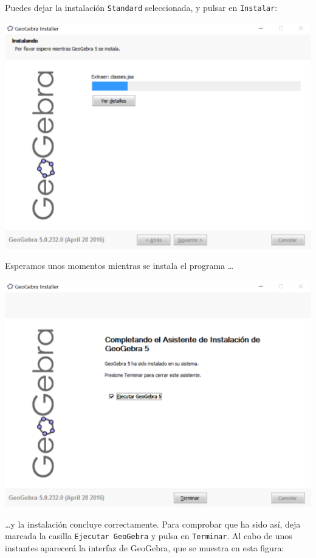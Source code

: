 \documentclass[10pt,a4paper]{article}
\begin{document}
Puedes dejar la instalación {\tt Standard} seleccionada, y pulsar en {\tt Instalar}:
    \begin{center}
    \includegraphics[width=14cm]{../fig/Tut00-GeoGebraSetup04-201605.png}
    \end{center}
Esperamos unos momentos mientras se instala el programa \ldots
    \begin{center}
    \includegraphics[width=14cm]{../fig/Tut00-GeoGebraSetup05-201605.png}
    \end{center}
\ldots y la instalación concluye correctamente. Para comprobar que ha sido así, deja marcada la
casilla {\tt Ejecutar GeoGebra} y pulsa en {\tt Terminar}. Al cabo de unos instantes aparecerá la
interfaz de GeoGebra, que se muestra en esta figura:
\end{document}
